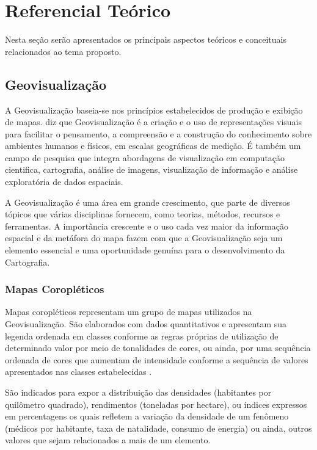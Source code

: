 \documentclass[12pt]{article}
\begin{document}
\section{Referencial Teórico}

Nesta seção serão apresentados os principais aspectos teóricos e conceituais relacionados ao tema proposto.

\subsection{Geovisualização}

A Geovisualização baseia-se nos princípios estabelecidos de produção e exibição de mapas. \citet{scig} diz que Geovisualização é a criação e o uso de representações visuais para facilitar o pensamento, a compreensão e a construção do conhecimento sobre ambientes humanos e físicos, em escalas geográficas de medição. É também um campo de pesquisa que integra abordagens de visualização em computação cientifica, cartografia, análise de imagens, visualização de informação e análise exploratória de dados espaciais.

A Geovisualização é uma área em grande crescimento, que parte de diversos tópicos que várias disciplinas fornecem, como teorias, métodos, recursos e ferramentas. A importância crescente e o uso cada vez maior da informação espacial e da metáfora do mapa fazem com que a Geovisualização seja um elemento essencial e uma oportunidade genuína para o desenvolvimento da Cartografia.

\subsubsection{Mapas Coropléticos}

Mapas coropléticos representam um grupo de mapas utilizados na Geovisualização. São elaborados com dados quantitativos e apresentam sua legenda ordenada em classes conforme as regras próprias de utilização de determinado valor por meio de tonalidades de cores, ou ainda, por uma sequência ordenada de cores que aumentam de intensidade conforme a sequência de valores apresentados nas classes estabelecidas \citep{maptematico}. 

São indicados para expor a distribuição das densidades (habitantes por quilômetro quadrado), rendimentos (toneladas por hectare), ou índices expressos em percentagens os quais refletem a variação da densidade de um fenômeno (médicos por habitante, taxa de natalidade, consumo de energia) ou ainda, outros valores que sejam relacionados a mais de um elemento.
\end{document}
